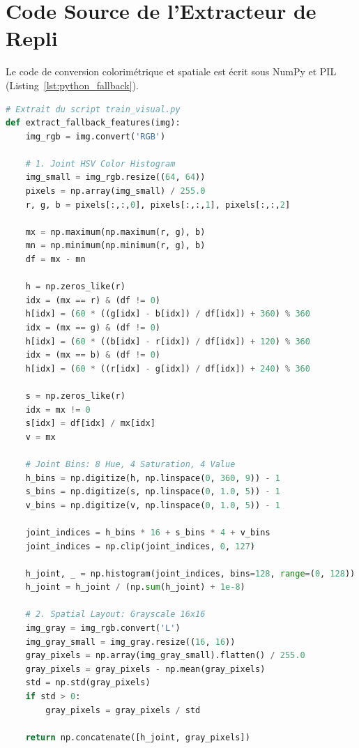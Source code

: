 \documentclass[12pt,a4paper]{article}
\begin{document}
\section{Code Source de l'Extracteur de Repli}
Le code de conversion colorimétrique et spatiale est écrit sous NumPy et PIL (Listing~\ref{lst:python_fallback}).

\begin{lstlisting}[language=Python, label=lst:python_fallback, caption=Calcul du descripteur HSV et spatial sous Python]
# Extrait du script train_visual.py
def extract_fallback_features(img):
    img_rgb = img.convert('RGB')
    
    # 1. Joint HSV Color Histogram
    img_small = img_rgb.resize((64, 64))
    pixels = np.array(img_small) / 255.0
    r, g, b = pixels[:,:,0], pixels[:,:,1], pixels[:,:,2]
    
    mx = np.maximum(np.maximum(r, g), b)
    mn = np.minimum(np.minimum(r, g), b)
    df = mx - mn
    
    h = np.zeros_like(r)
    idx = (mx == r) & (df != 0)
    h[idx] = (60 * ((g[idx] - b[idx]) / df[idx]) + 360) % 360
    idx = (mx == g) & (df != 0)
    h[idx] = (60 * ((b[idx] - r[idx]) / df[idx]) + 120) % 360
    idx = (mx == b) & (df != 0)
    h[idx] = (60 * ((r[idx] - g[idx]) / df[idx]) + 240) % 360
    
    s = np.zeros_like(r)
    idx = mx != 0
    s[idx] = df[idx] / mx[idx]
    v = mx
    
    # Joint Bins: 8 Hue, 4 Saturation, 4 Value
    h_bins = np.digitize(h, np.linspace(0, 360, 9)) - 1
    s_bins = np.digitize(s, np.linspace(0, 1.0, 5)) - 1
    v_bins = np.digitize(v, np.linspace(0, 1.0, 5)) - 1
    
    joint_indices = h_bins * 16 + s_bins * 4 + v_bins
    joint_indices = np.clip(joint_indices, 0, 127)
    
    h_joint, _ = np.histogram(joint_indices, bins=128, range=(0, 128))
    h_joint = h_joint / (np.sum(h_joint) + 1e-8)
    
    # 2. Spatial Layout: Grayscale 16x16
    img_gray = img_rgb.convert('L')
    img_gray_small = img_gray.resize((16, 16))
    gray_pixels = np.array(img_gray_small).flatten() / 255.0
    gray_pixels = gray_pixels - np.mean(gray_pixels)
    std = np.std(gray_pixels)
    if std > 0:
        gray_pixels = gray_pixels / std
        
    return np.concatenate([h_joint, gray_pixels])
\end{lstlisting}
\end{document}

